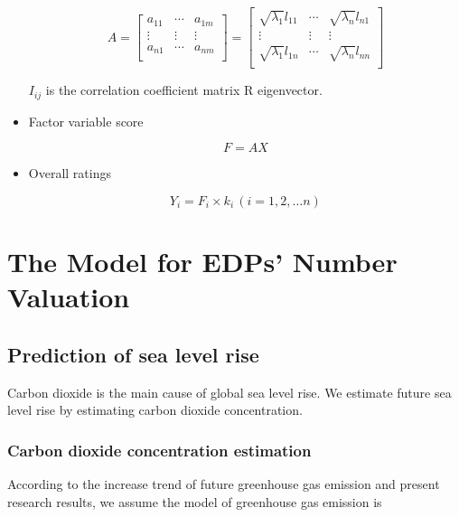 \documentclass[12pt]{article}  %
\begin{document}
\begin{itemize}
\begin{equation}
    A=\left[ \begin{matrix}
	a_{11}&		\cdots&		a_{1m}\\
	\vdots&		\vdots&		\vdots\\
	a_{n1}&		\cdots&		a_{nm}\\
\end{matrix} \right] =\left[ \begin{matrix}
	\sqrt{\lambda _1}l_{11}&		\cdots&		\sqrt{\lambda _n}l_{n1}\\
	\vdots&		\vdots&		\vdots\\
	\sqrt{\lambda _1}l_{1n}&		\cdots&		\sqrt{\lambda _n}l_{nn}\\
\end{matrix} \right] 
\end{equation}

$I_{ij}$ is the correlation coefficient matrix R eigenvector.
    
    \item Factor variable score
    
    \begin{equation}
        F=AX
    \end{equation}

    \item Overall ratings
    
\begin{equation}
    Y_i=F_i\times k_i\,(i=1,2,…n)
\end{equation}

    
\end{itemize}











\section{The Model for EDPs’ Number Valuation}

\subsection{Prediction of sea level rise}

Carbon dioxide is the main cause of global sea level rise. We estimate future sea level rise by estimating carbon dioxide concentration.

\subsubsection{Carbon dioxide concentration estimation}
According to the increase trend of future greenhouse gas emission and present research results, we assume the model of greenhouse gas emission is
\end{document}
